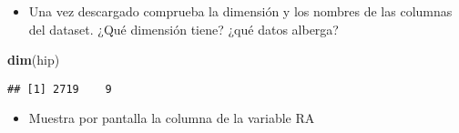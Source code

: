 \documentclass[]{article}
\newenvironment{Shaded}{\begin{snugshade}}{\end{snugshade}}
\newcommand{\KeywordTok}[1]{\textcolor[rgb]{0.13,0.29,0.53}{\textbf{#1}}}
\newcommand{\OperatorTok}[1]{\textcolor[rgb]{0.81,0.36,0.00}{\textbf{#1}}}
\newcommand{\NormalTok}[1]{#1}
\providecommand{\tightlist}{%
  \setlength{\itemsep}{0pt}\setlength{\parskip}{0pt}}
\begin{document}
\begin{itemize}
\tightlist
\item
  Una vez descargado comprueba la dimensión y los nombres de las
  columnas del dataset. ¿Qué dimensión tiene? ¿qué datos alberga?
\end{itemize}

\begin{Shaded}
\begin{Highlighting}[]
\KeywordTok{dim}\NormalTok{(hip)}
\end{Highlighting}
\end{Shaded}

\begin{verbatim}
## [1] 2719    9
\end{verbatim}

\begin{itemize}
\tightlist
\item
  Muestra por pantalla la columna de la variable RA
\end{itemize}

\begin{Shaded}
\end{Shaded}
\end{document}
